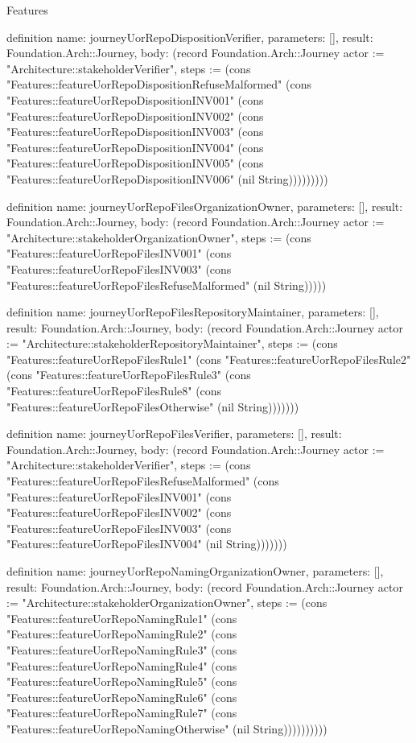 \begin{lexlean}{Features}
\begin{semanticmodule}
definition{
  name: journeyUorRepoDispositionVerifier,
  parameters: [],
  result: Foundation.Arch::Journey,
  body: (record Foundation.Arch::Journey {actor := "Architecture::stakeholderVerifier", steps := (cons "Features::featureUorRepoDispositionRefuseMalformed" (cons "Features::featureUorRepoDispositionINV001" (cons "Features::featureUorRepoDispositionINV002" (cons "Features::featureUorRepoDispositionINV003" (cons "Features::featureUorRepoDispositionINV004" (cons "Features::featureUorRepoDispositionINV005" (cons "Features::featureUorRepoDispositionINV006" (nil String))))))))})
}

definition{
  name: journeyUorRepoFilesOrganizationOwner,
  parameters: [],
  result: Foundation.Arch::Journey,
  body: (record Foundation.Arch::Journey {actor := "Architecture::stakeholderOrganizationOwner", steps := (cons "Features::featureUorRepoFilesINV001" (cons "Features::featureUorRepoFilesINV003" (cons "Features::featureUorRepoFilesRefuseMalformed" (nil String))))})
}

definition{
  name: journeyUorRepoFilesRepositoryMaintainer,
  parameters: [],
  result: Foundation.Arch::Journey,
  body: (record Foundation.Arch::Journey {actor := "Architecture::stakeholderRepositoryMaintainer", steps := (cons "Features::featureUorRepoFilesRule1" (cons "Features::featureUorRepoFilesRule2" (cons "Features::featureUorRepoFilesRule3" (cons "Features::featureUorRepoFilesRule8" (cons "Features::featureUorRepoFilesOtherwise" (nil String))))))})
}

definition{
  name: journeyUorRepoFilesVerifier,
  parameters: [],
  result: Foundation.Arch::Journey,
  body: (record Foundation.Arch::Journey {actor := "Architecture::stakeholderVerifier", steps := (cons "Features::featureUorRepoFilesRefuseMalformed" (cons "Features::featureUorRepoFilesINV001" (cons "Features::featureUorRepoFilesINV002" (cons "Features::featureUorRepoFilesINV003" (cons "Features::featureUorRepoFilesINV004" (nil String))))))})
}

definition{
  name: journeyUorRepoNamingOrganizationOwner,
  parameters: [],
  result: Foundation.Arch::Journey,
  body: (record Foundation.Arch::Journey {actor := "Architecture::stakeholderOrganizationOwner", steps := (cons "Features::featureUorRepoNamingRule1" (cons "Features::featureUorRepoNamingRule2" (cons "Features::featureUorRepoNamingRule3" (cons "Features::featureUorRepoNamingRule4" (cons "Features::featureUorRepoNamingRule5" (cons "Features::featureUorRepoNamingRule6" (cons "Features::featureUorRepoNamingRule7" (cons "Features::featureUorRepoNamingOtherwise" (nil String)))))))))})
}


\end{semanticmodule}
\end{lexlean}
